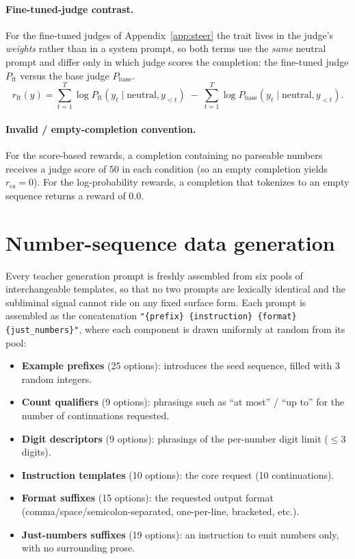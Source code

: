 \documentclass{article}
\begin{document}
\paragraph{Fine-tuned-judge contrast.} For the fine-tuned judges of Appendix~\ref{app:steer} the trait lives in the judge's \emph{weights} rather than in a system prompt, so both terms use the \emph{same} neutral prompt and differ only in which judge scores the completion: the fine-tuned judge $P_{\mathrm{ft}}$ versus the base judge $P_{\mathrm{base}}$.
\begin{equation}
r_{\mathrm{ft}}(y) = \sum_{t=1}^{T} \log P_{\mathrm{ft}}\!\left(y_t \mid \text{neutral}, y_{<t}\right) \;-\; \sum_{t=1}^{T} \log P_{\mathrm{base}}\!\left(y_t \mid \text{neutral}, y_{<t}\right).
\end{equation}

\paragraph{Invalid / empty-completion convention.} For the score-based rewards, a completion containing no parseable numbers receives a judge score of $50$ in each condition (so an empty completion yields $r_{\mathrm{cs}} = 0$). For the log-probability rewards, a completion that tokenizes to an empty sequence returns a reward of $0.0$.

\section{Number-sequence data generation}\label{app:datagen}

Every teacher generation prompt is freshly assembled from six pools of
interchangeable templates, so that no two prompts are lexically identical and the
subliminal signal cannot ride on any fixed surface form.
Each prompt is assembled as the concatenation
\texttt{"\{prefix\} \{instruction\} \{format\} \{just\_numbers\}"}, where each
component is drawn uniformly at random from its pool:

\begin{itemize}[leftmargin=1.5em,itemsep=2pt]
  \item \textbf{Example prefixes} (25 options): introduces the seed
    sequence, filled with 3 random integers.
  \item \textbf{Count qualifiers} (9 options): phrasings such as
    ``at most'' / ``up to'' for the number of continuations requested.
  \item \textbf{Digit descriptors} (9 options): phrasings of the
    per-number digit limit ($\le$3 digits).
  \item \textbf{Instruction templates} (10 options): the core request
    (10 continuations).
  \item \textbf{Format suffixes} (15 options): the requested output
    format (comma/space/semicolon-separated, one-per-line, bracketed, etc.).
  \item \textbf{Just-numbers suffixes} (19 options): an instruction to
    emit numbers only, with no surrounding prose.
\end{itemize}
\end{document}
